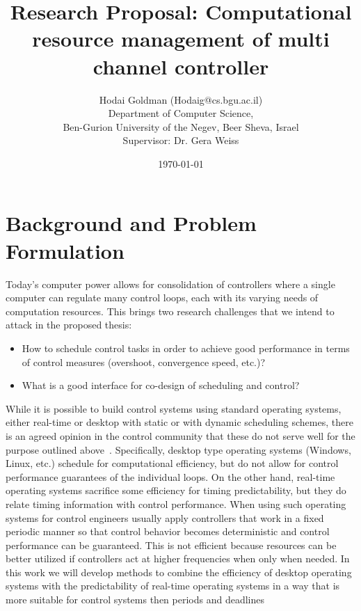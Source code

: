 \documentclass[11pt]{article}
\author{Hodai Goldman (Hodaig@cs.bgu.ac.il) \\
Department of Computer Science, \\
Ben-Gurion University of the Negev, Beer Sheva, Israel \\
Supervisor: Dr. Gera Weiss}
\date{\today}
\title{Research Proposal: Computational resource management of multi channel controller}
\begin{document}
\begin{titlepage}
\maketitle
\end{titlepage}




\section{Background and Problem Formulation}
\label{sec:problem}
Today’s computer power allows for consolidation of controllers where a single computer can regulate many control loops, each with its varying needs of computation resources.
This brings two research challenges that we intend to attack in the proposed thesis:
\begin{itemize}
	\item How to schedule control tasks in order to achieve good performance in terms of control measures (overshoot, convergence speed, etc.)?
	\item What is a good interface for co-design of scheduling and control?
\end{itemize}

While it is possible to build control systems using standard operating systems, either real-time or desktop with static or with dynamic scheduling schemes, there is an agreed opinion in the control community that these do not serve well for the purpose outlined above~\cite{?}. Specifically, desktop type operating systems (Windows, Linux, etc.) schedule for computational efficiency, but do not allow for control performance guarantees of the individual loops. On the other hand, real-time operating systems sacrifice some efficiency for timing predictability, but they do relate timing information with control performance. When using such operating systems for control engineers usually apply controllers that work in a fixed periodic manner so that control behavior becomes deterministic and control performance can be guaranteed. This is not efficient because resources can be better utilized if controllers act at higher frequencies when only when needed. 
In this work we will develop methods to combine the efficiency of desktop operating systems with the predictability of real-time operating systems in a way that is more suitable for control systems then periods and deadlines
\end{document}
